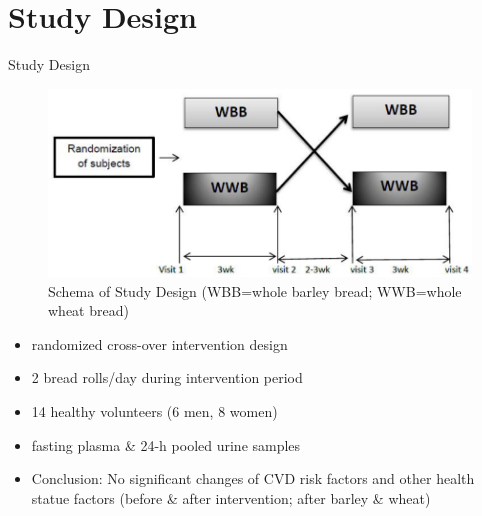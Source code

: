 \documentclass{beamer}
\begin{document}
\section{Study Design}
 \begin{frame}{Study Design}
 \begin{figure}[h]
    \centering
    \includegraphics[scale=0.3]{images/studes.PNG}
    \caption{Schema of Study Design (WBB=whole barley bread; WWB=whole wheat bread)}
        \label{fig:studes}
\end{figure}

\begin{itemize}
\item randomized cross-over intervention design
\item 2 bread rolls/day during intervention period
\item 14 healthy volunteers (6 men, 8 women)
\item fasting plasma \& 24-h pooled urine samples
\item Conclusion: No significant changes of CVD risk factors and other health statue factors (before \& after intervention; after barley \& wheat)
\end{itemize}
 \end{frame}
 

\end{document}
